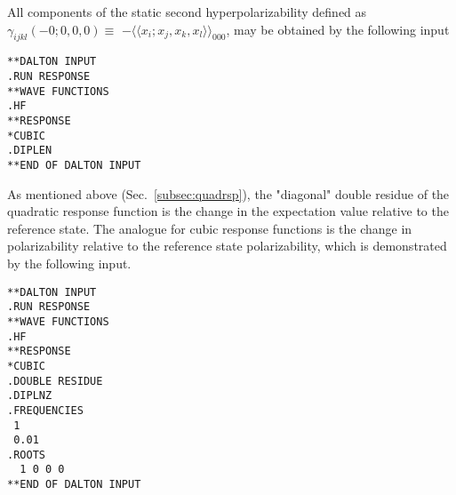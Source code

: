 All components of the static second hyperpolarizability
defined as $\gamma_{ijkl}(-0;0,0,0)\equiv$
$-\langle\!\langle x_i;x_j,x_k,x_l\rangle\!\rangle_{000}$,
 may be obtained by the following input

\begin{verbatim}
**DALTON INPUT
.RUN RESPONSE
**WAVE FUNCTIONS
.HF
**RESPONSE
*CUBIC
.DIPLEN
**END OF DALTON INPUT
\end{verbatim}



As  mentioned above (Sec.~\ref{subsec:quadrsp}), the "diagonal" 
double residue of the quadratic
response function is the change in the expectation value relative to the
reference state. The analogue for cubic
response functions is the change in
polarizability relative to the
reference state polarizability, which is demonstrated by the following
input.
\begin{verbatim}
**DALTON INPUT
.RUN RESPONSE
**WAVE FUNCTIONS
.HF
**RESPONSE
*CUBIC
.DOUBLE RESIDUE
.DIPLNZ
.FREQUENCIES
 1
 0.01
.ROOTS
  1 0 0 0
**END OF DALTON INPUT
\end{verbatim}



